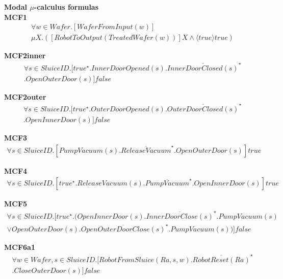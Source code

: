 \documentclass[12pt]{report}
\begin{document}
    \textbf{Modal $\mu$-calculus formulas}\\

    \textbf{MCF1}
    \begin{multline*}
        [true^{\star}] \forall w \in Wafer. [WaferFromInput(w)]\\
        \mu X.([RobotToOutput(TreatedWafer(w))]X \wedge \langle true \rangle true)
    \end{multline*}

    \textbf{MCF2inner}
    \begin{multline*}
        \forall s \in SluiceID.[true^{\star}.InnerDoorOpened(s).\overline{InnerDoorClosed(s)}^{\star}\\
        .OpenOuterDoor(s)]false
    \end{multline*}

    \textbf{MCF2outer}
    \begin{multline*}
        \forall s \in SluiceID.[true^{\star}.OuterDoorOpened(s).\overline{OuterDoorClosed(s)}^{\star}\\
        .OpenInnerDoor(s)]false
    \end{multline*}

    \textbf{MCF3}
    \begin{multline*}
        [true^{\star}] \forall s \in SluiceID. [PumpVacuum(s).\overline{ReleaseVacuum}^{\star}.OpenOuterDoor(s)]true
    \end{multline*}

    \textbf{MCF4}
    \begin{multline*}
        \forall s \in SluiceID.[true^{\star}.ReleaseVacuum(s).\overline{PumpVacuum}^{\star}.OpenInnerDoor(s)]true
    \end{multline*}

    \textbf{MCF5}
    \begin{multline*}
        \forall s \in SluiceID.[true^{\star}.(OpenInnerDoor(s).\overline{InnerDoorClose(s)}^{\star}.PumpVacuum(s)\\
        \vee OpenOuterDoor(s).\overline{OpenOuterDoorClose(s)}^{\star}.PumpVacuum(s))]false
    \end{multline*}

    \textbf{MCF6a1}
    \begin{multline*}
        [true^{\star}] \forall w \in Wafer, s \in SluiceID.[RobotFromSluice(Ra,s,w).\overline{RobotReset(Ra)}^{\star}\\
        .CloseOuterDoor(s)]false
    \end{multline*}
\end{document}
